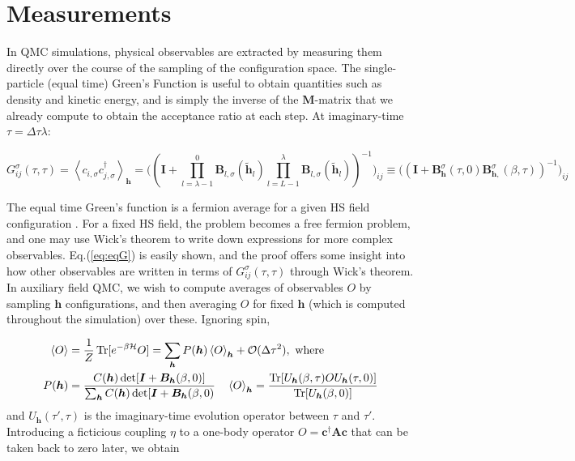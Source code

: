 \section{Measurements}
\label{subsec:measurements}

In QMC simulations, physical observables are extracted by measuring them directly over the course of the sampling of the  configuration space. The single-particle (equal time) Green's Function is useful to obtain quantities such as density and kinetic energy, and is simply the inverse of the $\bm M$-matrix that we already compute to obtain the acceptance ratio at each step.
At imaginary-time $\tau = \Delta \tau \lambda$: 

\begin{equation}\label{eq:eqG}
G_{ij}^\sigma ( \tau, \tau) = \left\langle c_{i,\sigma} c_{j,\sigma}^\dagger \right\rangle_{\bm h} = \bigg( (\bm I + \prod_{l= \lambda - 1}^0 \bm B_{l,\sigma} ( \widetilde{\bm h}_l ) \prod_{l= L -1}^\lambda \bm B_{l,\sigma} ( \widetilde{\bm h}_l )  )^{-1} \bigg)_{ij} \equiv \bigg( (\bm I + \bm B_{\bm h}^\sigma (\tau, 0) \bm B_{\bm h, }^\sigma (\beta, \tau)  )^{-1} \bigg)_{ij}
\end{equation}

The equal time Green's function is a fermion average for a given HS field configuration \cite{santos_introduction_2003}.
For a fixed HS field, the problem becomes a free fermion problem, and one may use Wick's theorem to write down expressions for more complex observables.
Eq.(\ref{eq:eqG}) is easily shown, and the proof offers some insight into how other observables are written in terms of $G_{ij}^\sigma (\tau, \tau)$ through Wick's theorem.
In auxiliary field \acs{QMC}, we wish to compute averages of observables $O$ by sampling $\bm h$ configurations, and then averaging $O$ for fixed $\bm h$ (which is computed throughout the simulation) over these.
Ignoring spin,

\begin{equation}
\begin{split}
\left\langle O \right\rangle &= \frac{1}{Z} \operatorname{Tr} [ e^{-\beta \mathcal{H} } O ] = \sum_{\bm h} P (\bm h) \left\langle O \right\rangle_{\bm h} + \mathcal{O}(\Delta \tau^2 ) , \,\,
\text{where} \\
P ( \bm h ) &= \frac{C(\bm h) \det [ \bm I + \bm B_{\bm h} ( \beta, 0 ) ] }{\sum_{\bm h} C(\bm h) \det [ \bm I + \bm B_{\bm h} ( \beta, 0 )} \quad
\left\langle O \right\rangle_{\bm h} = \frac{\operatorname{Tr}[ U_{\bm h} (\beta, \tau) O U_{\bm h} (\tau, 0)]}{\operatorname{Tr} [ U_{\bm h} (\beta, 0) ] } \\
\end{split}
\end{equation}
and $U_{\bm h} ( \tau', \tau)$ is the imaginary-time evolution operator between $\tau$ and $\tau'$.
Introducing a ficticious coupling $\eta$ to a one-body operator $O = \bm c^\dagger \bm A \bm c$ that can be taken back to zero later, we obtain 

